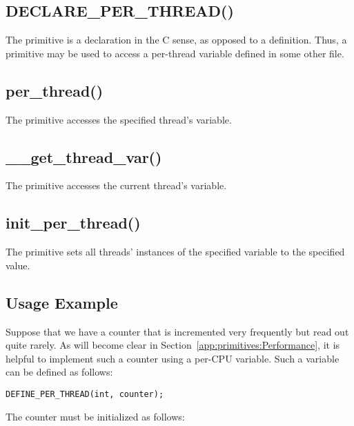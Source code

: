\subsection{DECLARE\_PER\_THREAD()}

The  primitive is a declaration in the C sense,
as opposed to a definition.
Thus, a  primitive may be used to access
a per-thread variable defined in some other file.

\subsection{per\_thread()}

The  primitive accesses the specified thread's variable.

\subsection{\_\_get\_thread\_var()}

The  primitive accesses the current thread's variable.

\subsection{init\_per\_thread()}

The  primitive sets all threads' instances of
the specified variable to the specified value.

\subsection{Usage Example}

Suppose that we have a counter that is incremented very frequently
but read out quite rarely.
As will become clear in
Section~\ref{app:primitives:Performance},
it is helpful to implement such a counter using a per-CPU variable.
Such a variable can be defined as follows:

\vspace{5pt}
\begin{minipage}[t]{\columnwidth}
\small
\begin{verbatim}
DEFINE_PER_THREAD(int, counter);
\end{verbatim}
\end{minipage}
\vspace{5pt}

The counter must be initialized as follows:

